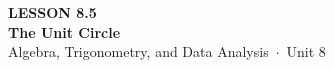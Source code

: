 \documentclass[aspectratio=169, 11pt]{beamer}
\begin{document}
{
\begin{frame}[plain]
  \vspace{2.8cm}\hspace{0.55cm}%
  \begin{minipage}{0.9\textwidth}
    {\color{goldacc}\bfseries\small LESSON 8.5}\\[0.5cm]
    {\color{white}\bfseries\LARGE The Unit Circle}\\[1.2cm]
    {\color{mistmid}\small Algebra, Trigonometry, and Data Analysis~$\cdot$~Unit 8}
  \end{minipage}
\end{frame}
}

\begin{frame}[t, plain]
\end{frame}
\end{document}
